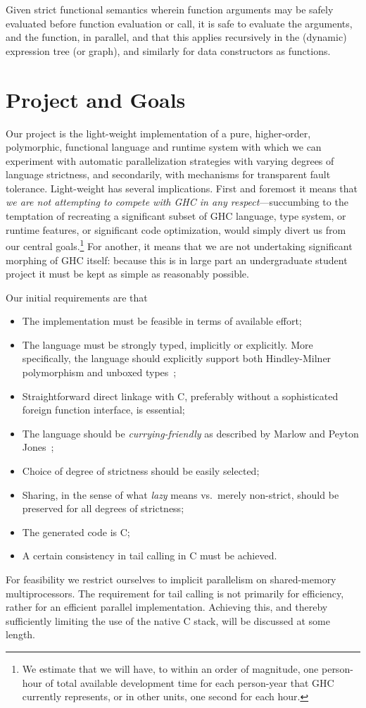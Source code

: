 \documentclass{llncs}
\begin{document}
Given strict functional semantics wherein function arguments may be safely
evaluated before function evaluation or call, it is safe to evaluate the
arguments, and the function, in parallel, and that this applies recursively in
the (dynamic) expression tree (or graph), and similarly for data constructors
as functions.

\section{Project and Goals}
Our project is the light-weight implementation of a pure, higher-order,
polymorphic, functional language and runtime system with which we can
experiment with automatic parallelization strategies with varying degrees of
language strictness, and secondarily, with mechanisms for transparent fault
tolerance.  Light-weight has several implications.  First and foremost it
means that \emph{we are not attempting to compete with GHC in any
  respect}---succumbing to the temptation of recreating a significant subset
of GHC language, type system, or runtime features, or significant code
optimization, would simply divert us from our central goals.\footnote{We
  estimate that we will have, to within an order of magnitude, one person-hour
  of total available development time for each person-year that GHC currently
  represents, or in other units, one second for each hour.}
For another, it means that we are not undertaking significant morphing of GHC
itself: because this is in large part an undergraduate student project it must
be kept as simple as reasonably possible.

Our initial requirements are that
\begin{itemize}
\item The implementation must be feasible in terms of available effort;
\item The language must be strongly typed, implicitly or explicitly.  More
  specifically, the language should explicitly support both Hindley-Milner
  polymorphism and unboxed types~\cite{Jones:1991};
\item Straightforward direct linkage with C, preferably without a sophisticated
  foreign function interface, is essential;
  \item The language should be \emph{currying-friendly} as described by Marlow
and Peyton Jones~\cite{Marlow:2004};
\item Choice of degree of strictness should be easily selected;
\item Sharing, in the sense of what \emph{lazy} means vs.\ merely non-strict,
  should be preserved for all degrees of strictness;
\item The generated code is C;
\item A certain consistency in tail calling in C must be achieved.
\end{itemize}
%
For feasibility we restrict ourselves to implicit parallelism on shared-memory
multiprocessors.  The requirement for tail calling is not primarily for
efficiency, rather for an efficient parallel implementation.  Achieving
this, and thereby sufficiently limiting the use of the native C stack, will be
discussed at some length.
\end{document}
